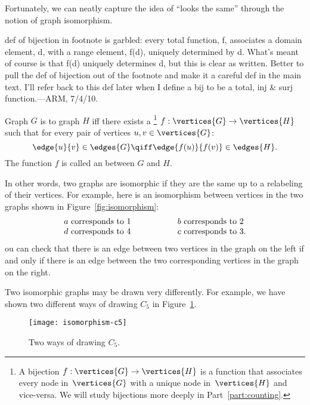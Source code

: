 Fortunately, we can neatly capture the idea of ``looks the same''
through the notion of graph isomorphism.

\begin{editingnotes}
  def of bijection in footnote is garbled: every total function, f,
  associates a domain element, d, with a range element, f(d), uniquely
  determined by d.  What's meant of course is that f(d) uniquely
  determines d, but this is clear as written.  Better to pull the def
  of bijection out of the footnote and make it a careful def in
  the main text.  I'll refer back to this def later when I define a bij to
  be a total, inj \& surj function.---ARM, 7/4/10.
\end{editingnotes}

\begin{definition}\label{simple-isomorphism}
  Graph $G$ is  to graph $H$ iff there exists a
  \footnote{A bijection $f: \vertices{G} \to \vertices{H}$
    is a function that associates every node in~$\vertices{G}$ with a
    unique node in~$\vertices{H}$ and vice-versa.  We will study
    bijections more deeply in Part~\ref{part:counting}.} $f:\vertices{G} \to \vertices{H}$
  such that for every pair of vertices $u, v \in \vertices{G}$:
\[
\edge{u}{v} \in \edges{G} \qiff \edge{f(u)}{f(v)} \in \edges{H}.
\]
The function $f$ is called an  between $G$ and $H$.
\end{definition}

In other words, two graphs are isomorphic if they are the same up to a
relabeling of their vertices.  For example, here is an isomorphism between
vertices in the two graphs shown in Figure~\ref{fig:isomorphism}:
\[
\begin{array}{lll}
a \text{ corresponds to } 1 & \hspace{0.5in} & b \text{ corresponds to } 2 \\
d \text{ corresponds to } 4 & & c \text{ corresponds to } 3.
\end{array}
\]
ou can check that there is an edge between two vertices in the graph
on the left if and only if there is an edge between the two
corresponding vertices in the graph on the right.

Two isomorphic graphs may be drawn very differently.  For example, we
have shown two different ways of drawing $C_5$ in
Figure~\ref{fig:isomorphism-c5}.

\begin{figure}\redrawn

\texttt{[image: isomorphism-c5]}

\caption{Two ways of drawing $C_5$.}
\label{fig:isomorphism-c5}
\end{figure}

